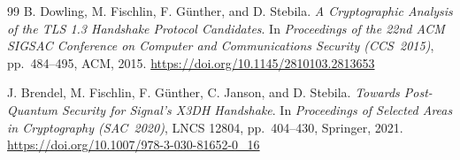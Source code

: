 \documentclass[11pt,a4paper]{article}
\theoremstyle{remark}
\theoremstyle{plain}
\begin{document}
\begin{thebibliography}{99}
B. Dowling, M. Fischlin, F. G\"unther, and D. Stebila.
\emph{A Cryptographic Analysis of the TLS 1.3 Handshake Protocol Candidates}.
In \emph{Proceedings of the 22nd ACM SIGSAC Conference on Computer and Communications Security (CCS~2015)}, pp.~484--495, ACM, 2015.
\url{https://doi.org/10.1145/2810103.2813653}

J. Brendel, M. Fischlin, F. G\"unther, C. Janson, and D. Stebila.
\emph{Towards Post-Quantum Security for Signal's X3DH Handshake}.
In \emph{Proceedings of Selected Areas in Cryptography (SAC~2020)}, LNCS 12804, pp.~404--430, Springer, 2021.
\url{https://doi.org/10.1007/978-3-030-81652-0_16}


\end{thebibliography}
\end{document}
